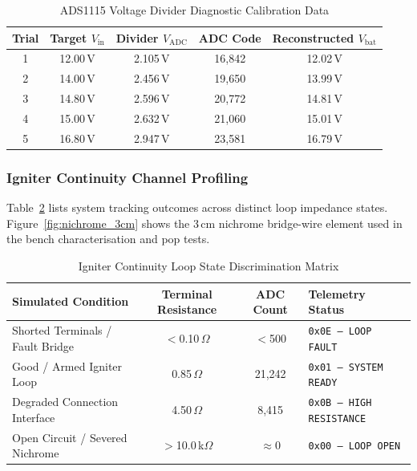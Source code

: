 \begin{table}[!htbp]
  \centering
  \caption{ADS1115 Voltage Divider Diagnostic Calibration Data}
  \label{tab:adc_voltage_calibration}
  \small
  \renewcommand{\arraystretch}{1.2}
  \begin{tabular}{@{}c|c|c|c|c@{}}
    \toprule
    \rowcolor{gray!22}\textbf{Trial} & \textbf{Target $V_\mathrm{in}$} & \textbf{Divider $V_\mathrm{ADC}$} & \textbf{ADC Code} & \textbf{Reconstructed $V_\mathrm{bat}$} \\ \midrule
    1 & 12.00\,V & 2.105\,V & 16{,}842 & 12.02\,V \\
    2 & 14.00\,V & 2.456\,V & 19{,}650 & 13.99\,V \\
    3 & 14.80\,V & 2.596\,V & 20{,}772 & 14.81\,V \\
    4 & 15.00\,V & 2.632\,V & 21{,}060 & 15.01\,V \\
    5 & 16.80\,V & 2.947\,V & 23{,}581 & 16.79\,V \\ \bottomrule
  \end{tabular}
\end{table}

\subsubsection{Igniter Continuity Channel Profiling}

Table~\ref{tab:continuity_fault_matrix} lists system tracking outcomes across
distinct loop impedance states. Figure~\ref{fig:nichrome_3cm} shows the 3\,cm
nichrome bridge-wire element used in the bench characterisation and pop tests.

\begin{table}[!htbp]
  \centering
  \caption{Igniter Continuity Loop State Discrimination Matrix}
  \label{tab:continuity_fault_matrix}
  \small
  \renewcommand{\arraystretch}{1.2}
  \begin{tabular}{@{}l|c|c|l@{}}
    \toprule
    \rowcolor{gray!22}\textbf{Simulated Condition} & \textbf{Terminal Resistance} & \textbf{ADC Count} & \textbf{Telemetry Status} \\ \midrule
    Shorted Terminals / Fault Bridge & $<$0.10\,$\Omega$ & $<$500 & \texttt{0x0E --- LOOP FAULT} \\
    Good / Armed Igniter Loop & 0.85\,$\Omega$ & 21{,}242 & \texttt{0x01 --- SYSTEM READY} \\
    Degraded Connection Interface & 4.50\,$\Omega$ & 8{,}415 & \texttt{0x0B --- HIGH RESISTANCE} \\
    Open Circuit / Severed Nichrome & $>$10.0\,k$\Omega$ & $\approx$0 & \texttt{0x00 --- LOOP OPEN} \\ \bottomrule
  \end{tabular}
\end{table}



